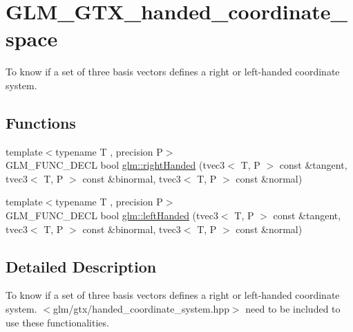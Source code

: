 \hypertarget{group__gtx__handed__coordinate__space}{\section{G\-L\-M\-\_\-\-G\-T\-X\-\_\-handed\-\_\-coordinate\-\_\-space}
\label{group__gtx__handed__coordinate__space}
}


To know if a set of three basis vectors defines a right or left-\/handed coordinate system.  


\subsection*{Functions}
\begin{DoxyCompactItemize}
\item 
{\footnotesize template$<$typename T , precision P$>$ }\\G\-L\-M\-\_\-\-F\-U\-N\-C\-\_\-\-D\-E\-C\-L bool \hyperlink{group__gtx__handed__coordinate__space_ga17cd83888de8755c0435c589fafd3603}{glm\-::right\-Handed} (tvec3$<$ T, P $>$ const \&tangent, tvec3$<$ T, P $>$ const \&binormal, tvec3$<$ T, P $>$ const \&normal)
\item 
{\footnotesize template$<$typename T , precision P$>$ }\\G\-L\-M\-\_\-\-F\-U\-N\-C\-\_\-\-D\-E\-C\-L bool \hyperlink{group__gtx__handed__coordinate__space_ga7425e0ebfe6a56919900a072ae1f8017}{glm\-::left\-Handed} (tvec3$<$ T, P $>$ const \&tangent, tvec3$<$ T, P $>$ const \&binormal, tvec3$<$ T, P $>$ const \&normal)
\end{DoxyCompactItemize}


\subsection{Detailed Description}
To know if a set of three basis vectors defines a right or left-\/handed coordinate system. $<$glm/gtx/handed\-\_\-coordinate\-\_\-system.\-hpp$>$ need to be included to use these functionalities. 

